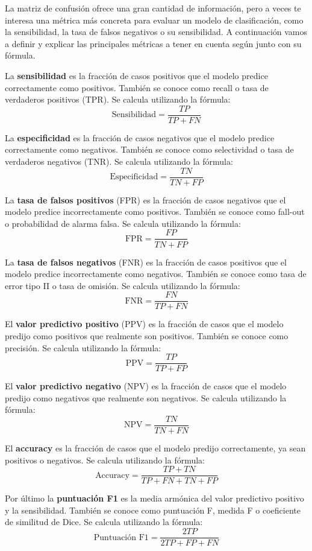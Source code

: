 La matriz de confusión ofrece una gran cantidad de información, pero a veces te interesa una métrica más concreta para evaluar un modelo de clasificación, como la sensibilidad, la tasa de falsos negativos o su sensibilidad. A continuación vamos a definir y explicar las principales métricas a tener en cuenta según \citep{erickson2021magician} junto con su fórmula. 

La \textbf{sensibilidad} es la fracción de casos positivos que el modelo predice correctamente como positivos. También se conoce como recall o tasa de verdaderos positivos (TPR). Se calcula utilizando la fórmula:
\[
\text{Sensibilidad} = \frac{TP}{TP + FN}
\]

La \textbf{especificidad} es la fracción de casos negativos que el modelo predice correctamente como negativos. También se conoce como selectividad o tasa de verdaderos negativos (TNR). Se calcula utilizando la fórmula:
\[
\text{Especificidad} = \frac{TN}{TN + FP}
\]

La \textbf{tasa de falsos positivos} (FPR) es la fracción de casos negativos que el modelo predice incorrectamente como positivos. También se conoce como fall-out o probabilidad de alarma falsa. Se calcula utilizando la fórmula:
\[
\text{FPR} = \frac{FP}{TN + FP}
\]

La \textbf{tasa de falsos negativos} (FNR) es la fracción de casos positivos que el modelo predice incorrectamente como negativos. También se conoce como tasa de error tipo II o tasa de omisión. Se calcula utilizando la fórmula:
\[
\text{FNR} = \frac{FN}{TP + FN}
\]

El \textbf{valor predictivo positivo} (PPV) es la fracción de casos que el modelo predijo como positivos que realmente son positivos. También se conoce como precisión. Se calcula utilizando la fórmula:
\[
\text{PPV} = \frac{TP}{TP + FP}
\]

El \textbf{valor predictivo negativo} (NPV) es la fracción de casos que el modelo predijo como negativos que realmente son negativos. Se calcula utilizando la fórmula:
\[
\text{NPV} = \frac{TN}{TN + FN}
\]

El \textbf{accuracy} es la fracción de casos que el modelo predijo correctamente, ya sean positivos o negativos. Se calcula utilizando la fórmula:
\[
\text{Accuracy} = \frac{TP + TN}{TP + FN + TN + FP}
\]

Por último la \textbf{puntuación F1} es la media armónica del valor predictivo positivo y la sensibilidad. También se conoce como puntuación F, medida F o coeficiente de similitud de Dice. Se calcula utilizando la fórmula:
\[
\text{Puntuación F1} = \frac{2TP}{2TP + FP + FN}
\]

